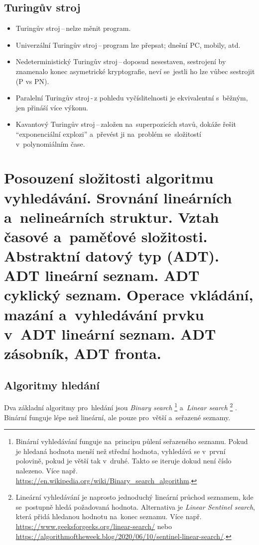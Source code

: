 \subsection{Turingův stroj}

\begin{itemize}
	\item Turingův stroj\,--\,nelze měnit program.
	\item Univerzální Turingův stroj\,--\,program lze přepsat; dnešní PC, mobily, atd.
	\item Nedeterministický Turingův stroj\,--\,doposud nesestaven, sestrojení by znamenalo konec asymetrické kryptografie, neví se~jestli ho lze vůbec sestrojit (P vs PN).
	\item Paralelní Turingův stroj\,-\,z pohledu vyčíslitelnosti je ekvivalentní s~běžným, jen přináší více výkonu.
	\item Kavantový Turingův stroj\,--\,založen na~superpozicích stavů, dokáže řešit \enquote{exponenciální explozi} a~převést ji na~problém se~složitostí v~polynomiálním čase.
\end{itemize}

\clearpage
\section{Posouzení složitosti algoritmu vyhledávání. Srovnání lineárních a~nelineárních struktur. Vztah časové a~paměťové složitosti. Abstraktní datový typ (ADT). ADT lineární seznam. ADT cyklický seznam. Operace vkládání, mazání a~vyhledávání prvku v~ADT lineární seznam. ADT zásobník, ADT fronta.}

\subsection{Algoritmy hledání}

Dva základní algoritmy pro~hledání jsou \textit{Binary search}%
\footnote{Binární vyhledávání funguje na~principu půlení seřazeného seznamu. Pokud je hledaná hodnota menší než střední hodnota, vyhledává se v~první polovině, pokud je větší tak v~druhé. Takto se iteruje dokud není číslo nalezeno. Více např. \url{https://en.wikipedia.org/wiki/Binary_search_algorithm}.} %
a~\textit{Linear search}%
\footnote{Lineární vyhledávání je naprosto jednoduchý lineární průchod seznamem, kde se~postupně hledá požadovaná hodnota. Alternativa je \emph{Linear Sentinel search}, která přidá hledanou hodnotu na~konec seznamu. Více např. \url{https://www.geeksforgeeks.org/linear-search/} nebo \url{https://algorithmoftheweek.blog/2020/06/10/sentinel-linear-search/}.}%
. Binární funguje lépe než lineární, ale pouze pro~větší a~seřazené seznamy.

